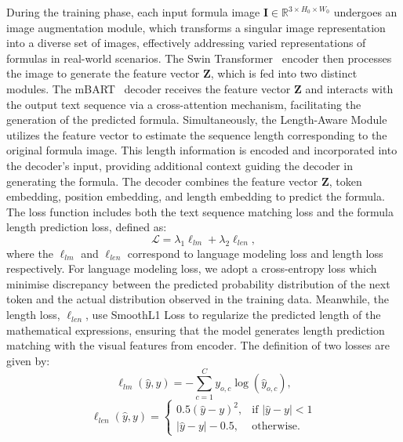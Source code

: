 \documentclass[runningheads]{llncs}
\begin{document}
During the training phase, each input formula image $\mathbf{I} \in \mathbb{R}^{3 \times H_0 \times W_0}$ undergoes an image augmentation module, which transforms a singular image representation into a diverse set of images, effectively addressing varied representations of formulas in real-world scenarios. The Swin Transformer~\cite{liu2021swin} encoder then processes the image to generate the feature vector $\mathbf{Z}$, which is fed into two distinct modules. The mBART~\cite{lewis2019bart} decoder receives the feature vector $\mathbf{Z}$ and interacts with the output text sequence via a cross-attention mechanism, facilitating the generation of the predicted formula. Simultaneously, the Length-Aware Module utilizes the feature vector to estimate the sequence length corresponding to the original formula image. This length information is encoded and incorporated into the decoder's input, providing additional context guiding the decoder in generating the formula. The decoder combines the feature vector $\mathbf{Z}$, token embedding, position embedding, and length embedding to predict the formula. The loss function includes both the text sequence matching loss and the formula length prediction loss, defined as:
\begin{equation}
    \mathcal{L} = \lambda_1 \ell_{lm} + \lambda_2 \ell_{len},
\end{equation}
where the $\ell_{lm}$ and $\ell_{len}$ correspond to language modeling loss and length loss respectively. For language modeling loss, we adopt a cross-entropy loss which minimise discrepancy between the predicted probability distribution of the next token and the actual distribution observed in the training data. Meanwhile, the length loss, $\ell_{len}$, use SmoothL1 Loss to regularize the predicted length of the mathematical expressions, ensuring that the model generates length prediction matching with the visual features from encoder. The definition of two losses are given by:
\begin{equation}
    \ell_{lm}(\hat{y}, y) = -\sum_{c=1}^{C} y_{o,c} \log(\hat{y}_{o,c}),
\end{equation}
\begin{equation}
    \ell_{len}(\hat{y}, y) = 
    \begin{cases} 
        0.5(\hat{y} - y)^2, & \text{if } |\hat{y} - y| < 1 \\
        |\hat{y} - y| - 0.5, & \text{otherwise}.
    \end{cases}
\end{equation}
\end{document}
